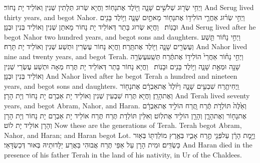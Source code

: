 {וַיְחִ֥י שְׂר֖וּג שְׁלֹשִׁ֣ים שָׁנָ֑ה וַיּ֖וֹלֶד אֶת\maqqaf נָחֽוֹר׃}
{וַחֲיָא שְׂרוּג תְּלָתִין שְׁנִין וְאוֹלֵיד יָת נָחוֹר׃}
{And Serug lived thirty years, and begot Nahor.}{}
{וַיְחִ֣י שְׂר֗וּג אַחֲרֵ֛י הוֹלִיד֥וֹ אֶת\maqqaf נָח֖וֹר מָאתַ֣יִם שָׁנָ֑ה וַיּ֥וֹלֶד בָּנִ֖ים וּבָנֽוֹת׃ \setuma }
{וַחֲיָא שְׂרוּג בָּתַר דְּאוֹלֵיד יָת נָחוֹר מָאתַן שְׁנִין וְאוֹלֵיד בְּנִין וּבְנָן׃}
{And Serug lived after he begot Nahor two hundred years, and begot sons and daughters.}{}
{וַיְחִ֣י נָח֔וֹר תֵּ֥שַׁע וְעֶשְׂרִ֖ים שָׁנָ֑ה וַיּ֖וֹלֶד אֶת\maqqaf תָּֽרַח׃}
{וַחֲיָא נָחוֹר עֶשְׂרִין וּתְשַׁע שְׁנִין וְאוֹלֵיד יָת תָּרַח׃}
{And Nahor lived nine and twenty years, and begot Terah.}{}
{וַיְחִ֣י נָח֗וֹר אַחֲרֵי֙ הוֹלִיד֣וֹ אֶת\maqqaf תֶּ֔רַח תְּשַֽׁע\maqqaf עֶשְׂרֵ֥ה שָׁנָ֖ה וּמְאַ֣ת שָׁנָ֑ה וַיּ֥וֹלֶד בָּנִ֖ים וּבָנֽוֹת׃ \setuma }
{וַחֲיָא נָחוֹר בָּתַר דְּאוֹלֵיד יָת תֶּרַח מְאָה וּתְשַׁע עֶשְׂרֵי שְׁנִין וְאוֹלֵיד בְּנִין וּבְנָן׃}
{And Nahor lived after he begot Terah a hundred and nineteen years, and begot sons and daughters.}{}
{וַֽיְחִי\maqqaf תֶ֖רַח שִׁבְעִ֣ים שָׁנָ֑ה וַיּ֙וֹלֶד֙ אֶת\maqqaf אַבְרָ֔ם אֶת\maqqaf נָח֖וֹר וְאֶת\maqqaf הָרָֽן׃}
{וַחֲיָא תֶּרַח שִׁבְעִין שְׁנִין וְאוֹלֵיד יָת אַבְרָם יָת נָחוֹר וְיָת הָרָן׃}
{And Terah lived seventy years, and begot Abram, Nahor, and Haran.}{}
{וְאֵ֙לֶּה֙ תּוֹלְדֹ֣ת תֶּ֔רַח תֶּ֚רַח הוֹלִ֣יד אֶת\maqqaf אַבְרָ֔ם אֶת\maqqaf נָח֖וֹר וְאֶת\maqqaf הָרָ֑ן וְהָרָ֖ן הוֹלִ֥יד אֶת\maqqaf לֽוֹט׃}
{וְאִלֵּין תּוֹלְדָת תֶּרַח תֶּרַח אוֹלֵיד יָת אַבְרָם יָת נָחוֹר וְיָת הָרָן וְהָרָן אוֹלֵיד יָת לוֹט׃}
{Now these are the generations of Terah. Terah begot Abram, Nahor, and Haran; and Haran begot Lot.}{}
{וַיָּ֣מׇת הָרָ֔ן עַל\maqqaf פְּנֵ֖י תֶּ֣רַח אָבִ֑יו בְּאֶ֥רֶץ מוֹלַדְתּ֖וֹ בְּא֥וּר כַּשְׂדִּֽים׃}
{וּמִית הָרָן עַל אַפֵּי תֶּרַח אֲבוּהִי בַּאֲרַע יַלָּדוּתֵיהּ בְּאוּר דְּכַשְׂדָּאֵי׃}
{And Haran died in the presence of his father Terah in the land of his nativity, in Ur of the Chaldees.}{}
